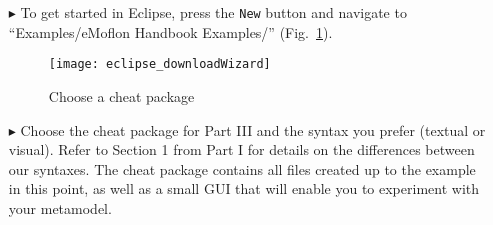 \begin{itemize}

\item[$\blacktriangleright$] To get started in Eclipse, press the \texttt{New} button and navigate to ``Examples/eMoflon Handbook Examples/''
(Fig.~\ref{eclipse:downloadWizard}).

\begin{figure}[htbp]
	\centering
  \texttt{[image: eclipse\_downloadWizard]}
	\caption{Choose a cheat package}
	\label{eclipse:downloadWizard}
\end{figure}

\item[$\blacktriangleright$] Choose the cheat package for Part III and the syntax you prefer (textual or visual). Refer to Section 1 from Part I for details on
the differences between our syntaxes. The cheat package contains all files created up to the example in this point, as well as a small GUI that will enable
you to experiment with your metamodel.

\newpage

\vspace*{0.5cm}
%
%
%
\end{itemize}
%
%
%

